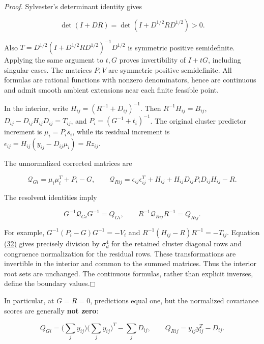 \documentclass[11pt]{article}
\providecommand{\square}{\mdlgwhtsquare}
\begin{document}
\emph{Proof.} Sylvester's determinant identity gives

\begin{equation*}
\det(I+DR)=\det(I+D^{1/2}RD^{1/2})>0.
\tag{30}\label{eq:30}
\end{equation*}

Also \(T=D^{1/2}(I+D^{1/2}RD^{1/2})^{-1}D^{1/2}\) is symmetric positive semidefinite. Applying the same argument to \(t,G\) proves invertibility of \(I+tG\), including singular cases. The matrices \(P,V\) are symmetric positive semidefinite. All formulas are rational functions with nonzero denominators, hence are continuous and admit smooth ambient extensions near each finite feasible point.

In the interior, write \(H_{ij}=(R^{-1}+D_{ij})^{-1}\). Then
\(R^{-1}H_{ij}=B_{ij}\), \(D_{ij}-D_{ij}H_{ij}D_{ij}=T_{ij}\), and
\(P_i=(G^{-1}+t_i)^{-1}\). The original cluster predictor increment is \(\mu_i=P_is_i\), while its residual increment is
\(\epsilon_{ij}=H_{ij}(y_{ij}-D_{ij}\mu_i)=Rz_{ij}\).

The unnormalized corrected matrices are

\begin{equation*}
\mathcal Q_{Gi}=\mu_i\mu_i^T+P_i-G,
\qquad
\mathcal Q_{Rij}=\epsilon_{ij}\epsilon_{ij}^T+H_{ij}
 +H_{ij}D_{ij}P_iD_{ij}H_{ij}-R.
\tag{31}\label{eq:31}
\end{equation*}

The resolvent identities imply

\begin{equation*}
G^{-1}\mathcal Q_{Gi}G^{-1}=Q_{Gi},\qquad
R^{-1}\mathcal Q_{Rij}R^{-1}=Q_{Rij}.
\tag{32}\label{eq:32}
\end{equation*}

For example, \(G^{-1}(P_i-G)G^{-1}=-V_i\) and
\(R^{-1}(H_{ij}-R)R^{-1}=-T_{ij}\). Equation \hyperref[eq:32]{(32)} gives precisely division by \(\sigma_d^4\) for the retained cluster diagonal rows and congruence normalization for the residual rows. These transformations are invertible in the interior and common to the summed matrices. Thus the interior root sets are unchanged. The continuous formulas, rather than explicit inverses, define the boundary values.\hfill$\square$

In particular, at \(G=R=0\), predictions equal one, but the normalized covariance scores are generally \textbf{not zero}:

\begin{equation*}
Q_{Gi}=\Big(\sum_jy_{ij}\Big)\Big(\sum_jy_{ij}\Big)^T-\sum_jD_{ij},
\qquad Q_{Rij}=y_{ij}y_{ij}^T-D_{ij}.
\tag{33}\label{eq:33}
\end{equation*}
\end{document}
